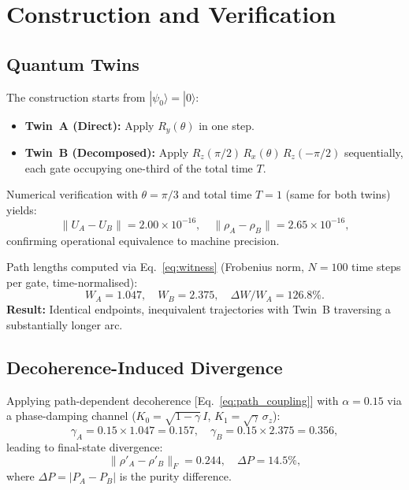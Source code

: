 \documentclass[12pt,a4paper]{article}
\begin{document}
\section{Construction and Verification}

\subsection{Quantum Twins}

The construction starts from $|\psi_0\rangle = |0\rangle$:
\begin{itemize}
  \item \textbf{Twin~A (Direct):} Apply $R_y(\theta)$ in one step.
  \item \textbf{Twin~B (Decomposed):} Apply
    $R_z(\pi/2)\,R_x(\theta)\,R_z(-\pi/2)$ sequentially, each gate
    occupying one-third of the total time $T$.
\end{itemize}

Numerical verification with $\theta = \pi/3$ and total time $T=1$
(same for both twins) yields:
\begin{equation}
  \|U_A - U_B\| = 2.00\times 10^{-16},\quad
  \|\rho_A - \rho_B\| = 2.65\times 10^{-16},
\end{equation}
confirming operational equivalence to machine precision.

Path lengths computed via Eq.~\eqref{eq:witness} (Frobenius norm,
$N=100$ time steps per gate, time-normalised):
\begin{equation}
  W_A = 1.047,\quad W_B = 2.375,\quad \Delta W/W_A = 126.8\%.
  \label{eq:path_values}
\end{equation}
\textbf{Result:} Identical endpoints, inequivalent trajectories with
Twin~B traversing a substantially longer arc.

\subsection{Decoherence-Induced Divergence}

Applying path-dependent decoherence [Eq.~\eqref{eq:path_coupling}] with
$\alpha = 0.15$ via a phase-damping channel
($K_0 = \sqrt{1-\gamma}\,I$, $K_1 = \sqrt{\gamma}\,\sigma_z$):
\begin{equation}
  \gamma_A = 0.15 \times 1.047 = 0.157,\quad
  \gamma_B = 0.15 \times 2.375 = 0.356,
\end{equation}
leading to final-state divergence:
\begin{equation}
  \|\rho'_A - \rho'_B\|_F = 0.244,\quad \Delta P = 14.5\%,
\end{equation}
where $\Delta P = |P_A - P_B|$ is the purity difference.
\end{document}
